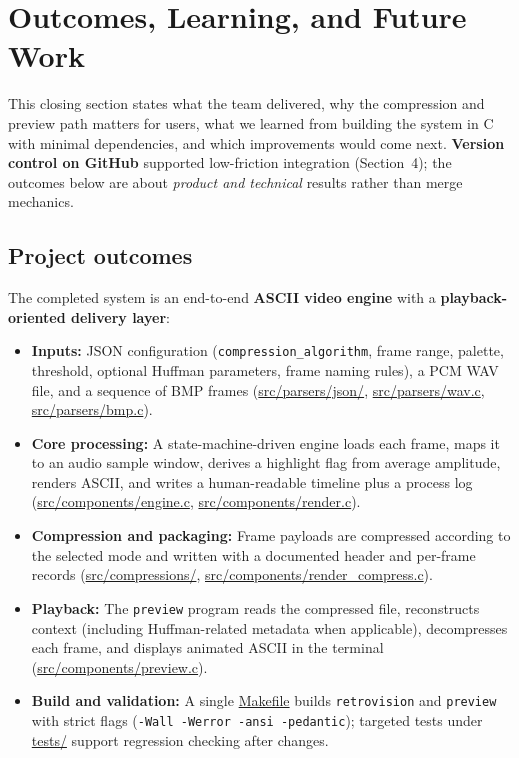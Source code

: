 \section{Outcomes, Learning, and Future Work}

This closing section states what the team delivered, why the compression and preview path matters for users, what we learned from building the system in C with minimal dependencies, and which improvements would come next. \textbf{Version control on GitHub} supported low-friction integration (Section~4); the outcomes below are about \emph{product and technical} results rather than merge mechanics.

\subsection{Project outcomes}
The completed system is an end-to-end \textbf{ASCII video engine} with a \textbf{playback-oriented delivery layer}:

\begin{itemize}
    \item \textbf{Inputs:} JSON configuration (\texttt{compression\_algorithm}, frame range, palette, threshold, optional Huffman parameters, frame naming rules), a PCM WAV file, and a sequence of BMP frames (\url{src/parsers/json/}, \url{src/parsers/wav.c}, \url{src/parsers/bmp.c}).
    \item \textbf{Core processing:} A state-machine-driven engine loads each frame, maps it to an audio sample window, derives a highlight flag from average amplitude, renders ASCII, and writes a human-readable timeline plus a process log (\url{src/components/engine.c}, \url{src/components/render.c}).
    \item \textbf{Compression and packaging:} Frame payloads are compressed according to the selected mode and written with a documented header and per-frame records (\url{src/compressions/}, \url{src/components/render_compress.c}).
    \item \textbf{Playback:} The \texttt{preview} program reads the compressed file, reconstructs context (including Huffman-related metadata when applicable), decompresses each frame, and displays animated ASCII in the terminal (\url{src/components/preview.c}).
    \item \textbf{Build and validation:} A single \url{Makefile} builds \texttt{retrovision} and \texttt{preview} with strict flags (\texttt{-Wall -Werror -ansi -pedantic}); targeted tests under \url{tests/} support regression checking after changes.
\end{itemize}

